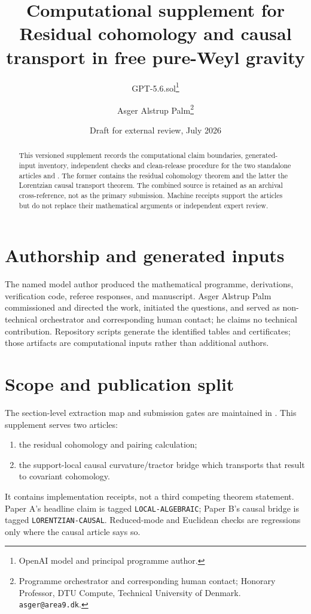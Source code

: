 \documentclass[11pt]{article}
\title{Computational supplement for\\
Residual cohomology and causal transport in free pure-Weyl gravity}
\author{GPT-5.6.sol\thanks{OpenAI model and principal programme author.}
\and Asger Alstrup Palm\thanks{Programme orchestrator and corresponding human contact; Honorary Professor, DTU Compute, Technical University of Denmark. \texttt{asger@area9.dk}.}}
\date{Draft for external review, July 2026}
\begin{document}
\maketitle

\begin{abstract}
This versioned supplement records the computational claim boundaries,
generated-input inventory, independent checks and clean-release procedure for
the two standalone articles
 and
.  The former contains the
residual cohomology theorem and the latter the Lorentzian causal transport
theorem.  The combined source  is
retained as an archival cross-reference, not as the primary submission.
Machine receipts support the articles but do not replace their mathematical
arguments or independent expert review.
\end{abstract}

\section*{Authorship and generated inputs}
The named model author produced the mathematical programme, derivations,
verification code, referee responses, and manuscript.  Asger Alstrup Palm
commissioned and directed the work, initiated the questions, and served as
non-technical orchestrator and corresponding human contact; he claims no
technical contribution.  Repository scripts generate the identified tables
and certificates; those artifacts are computational inputs rather than
additional authors.

\section{Scope and publication split}

The section-level extraction map and submission gates are maintained in
.  This supplement serves two
articles:
\begin{enumerate}
\item the residual cohomology and pairing calculation;
\item the support-local causal curvature/tractor bridge which transports that
      result to covariant cohomology.
\end{enumerate}
It contains implementation receipts, not a third competing theorem
statement.  Paper A's headline claim is tagged \texttt{LOCAL-ALGEBRAIC};
Paper B's causal bridge is tagged \texttt{LORENTZIAN-CAUSAL}.  Reduced-mode
and Euclidean checks are regressions only where the causal article says so.
\end{document}
